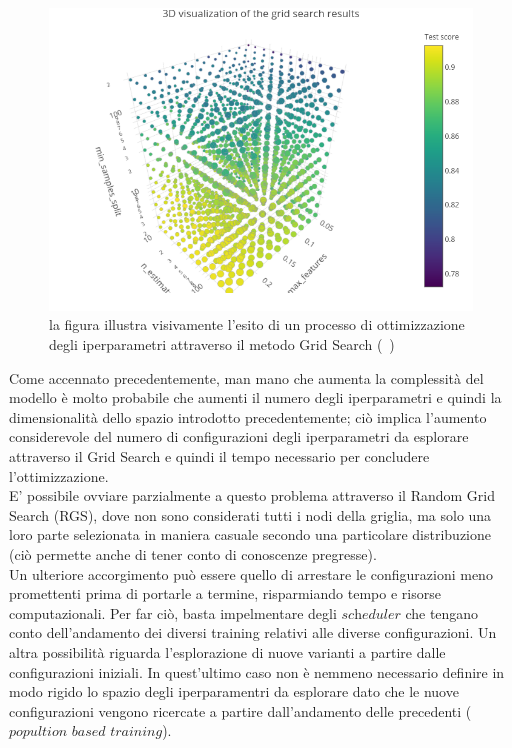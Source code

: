 \begin{figure}[h!]
	\includegraphics[width=\linewidth]{figs/Grid_immagine.png}
	\caption{la figura illustra visivamente l'esito di un processo di ottimizzazione degli iperparametri attraverso il metodo Grid Search (~\cite{knuthwebsite})}
	\label{fig:Grid Search}
\end{figure}
\newpage 

Come accennato precedentemente, man mano che aumenta la complessità del modello è molto probabile che aumenti il numero degli iperparametri e quindi la dimensionalità dello spazio introdotto precedentemente; ciò implica l'aumento considerevole del numero di configurazioni degli iperparametri da esplorare attraverso il Grid Search e quindi il tempo necessario per concludere l'ottimizzazione.\\
E' possibile ovviare parzialmente a questo problema attraverso il Random Grid Search (RGS), dove non sono considerati tutti i nodi della griglia, ma solo una loro parte selezionata in maniera casuale secondo una particolare distribuzione (ciò permette anche di tener conto di conoscenze pregresse). \\
Un ulteriore accorgimento può  essere quello di arrestare le configurazioni meno promettenti prima di portarle a termine, risparmiando tempo e risorse computazionali. Per far ciò, basta impelmentare degli $\textit{scheduler}$ che tengano conto dell'andamento dei diversi training relativi alle diverse configurazioni. Un altra possibilità riguarda l'esplorazione di nuove varianti a partire dalle configurazioni iniziali. In quest'ultimo caso non è nemmeno necessario definire in modo rigido lo spazio degli iperparamentri da esplorare dato che le nuove configurazioni vengono ricercate a partire dall'andamento delle precedenti ($\textit{popultion based training}$).

